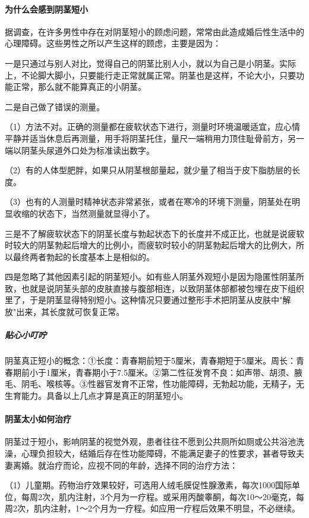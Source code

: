 \paragraph{为什么会感到阴茎短小}

据调查，在许多男性中存在对阴茎短小的顾虑问题，常常由此造成婚后性生活中的心理障碍。这些男性之所以产生这样的顾虑，主要是因为：

一是只通过与别人对比，觉得自己的阴茎比别人小，就以为自己是小阴茎。实际上，不论脚大脚小，只要能行走正常就属正常。阴茎也是这样，不论大小，只要功能正常，那么就不能算真正的小阴茎。

二是自己做了错误的测量。

（1）方法不对。正确的测量都在疲软状态下进行，测量时环境温暖适宜，应心情平静并适当休息后再测量，用手将阴茎托住，量尺一端稍用力顶住耻骨前方，另一端以阴茎头尿道外口处为标准读出数字。

（2）有的人体型肥胖，如果只从阴茎根部量起，就少量了相当于皮下脂肪层的长度。

（3）也有的人测量时精神状态非常紧张，或者在寒冷的环境下测量，阴茎处在明显收缩的状态下，当然测量就显得小了。

三是不了解疲软状态下的阴茎长度与勃起状态下的长度并不成正比，也就是说疲软时较大的阴茎勃起后增大的比例小，而疲软时较小的阴茎勃起后增大的比例大，所以最终两者勃起的长度基本上是相似的。

四是忽略了其他因素引起的阴茎短小。如有些人阴茎外观短小是因为隐匿性阴茎所致，也就是说阴茎头部的皮肤直接与腹部相连，以致阴茎体部都被包埋在皮下组织里了，于是阴茎显得特别短小。这种情况只要通过整形手术把阴茎从皮肤中"解放"出来，其长度就可恢复正常。

\subparagraph{贴心小叮咛}

阴茎真正短小的概念：①长度：青春期前短于5厘米，青春期短于5厘米。周长：青春期前小于1厘米，青春期小于7.5厘米。②第二性征发育不良：如声带、胡须、腋毛、阴毛、喉核等。③性器官发育不正常，性功能障碍，无勃起功能，无精子，无生育能力。具备以上几点才算是真正的阴茎短小。

\paragraph{阴茎太小如何治疗}

阴茎过于短小，影响阴茎的视觉外观，患者往往不愿到公共厕所如厕或公共浴池洗澡，心理负担较大，结婚后存在性功能障碍，不能满足妻子的性要求，甚者导致夫妻离婚。就治疗而论，应视不同的年龄，选择不同的治疗方法：

（1）儿童期。药物治疗效果较好，可选用人绒毛膜促性腺激素，每次1000国际单位，每周2次，肌内注射，3个月为一疗程。或采用丙酸睾酮，每次10～20毫克，每周2次，肌内注射，1～2个月为一疗程。如应用一疗程后效果不明显，不必继续。

